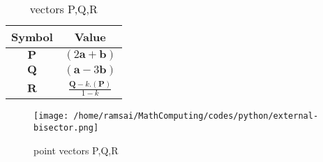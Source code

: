 \documentclass{article}
\let\vec\mathbf
\begin{document}
\begin{table}[h]
    \centering
    \begin{tabular}{|c|c|}
        \hline
        \textbf{Symbol} & \textbf{Value} \\
        \hline
	$\vec{P}$ & $(2\vec{a}+\vec{b})$ \\
        \hline
	$\vec{Q}$ & $(\vec{a}-3\vec{b})$ \\
        \hline
	    $\vec{R}$ & $\frac{\vec{Q}-k.(\vec{P})}{1-k}$ \\
        \hline
    \end{tabular}
    \label{tab:mytable}
    \caption{vectors P,Q,R}
\end{table}
\begin{figure}[!ht]
    \centering
    \texttt{[image: /home/ramsai/MathComputing/codes/python/external-bisector.png]}
    \caption{point vectors P,Q,R}
    \label{fig:enter-label}
\end{figure}
\end{document}
